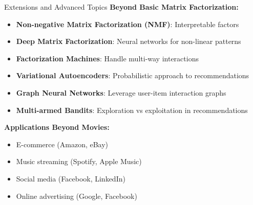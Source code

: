 \documentclass{beamer}
\begin{document}
\begin{frame}{Extensions and Advanced Topics}
\textbf{Beyond Basic Matrix Factorization:}

\pause
\begin{itemize}[<+->]
    \item \textbf{Non-negative Matrix Factorization (NMF)}: Interpretable factors
    
    \item \textbf{Deep Matrix Factorization}: Neural networks for non-linear patterns
    
    \item \textbf{Factorization Machines}: Handle multi-way interactions
    
    \item \textbf{Variational Autoencoders}: Probabilistic approach to recommendations
    
    \item \textbf{Graph Neural Networks}: Leverage user-item interaction graphs
    
    \item \textbf{Multi-armed Bandits}: Exploration vs exploitation in recommendations
\end{itemize}

\pause
\textbf{Applications Beyond Movies:}
\begin{itemize}[<+->]
    \item E-commerce (Amazon, eBay)
    \item Music streaming (Spotify, Apple Music)  
    \item Social media (Facebook, LinkedIn)
    \item Online advertising (Google, Facebook)
\end{itemize}
\end{frame}
\end{document}
